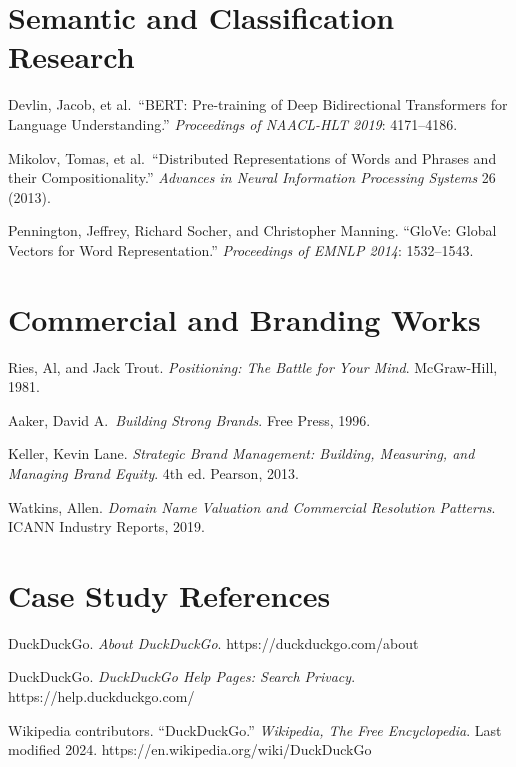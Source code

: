 \documentclass[12pt, openany]{book}
\theoremstyle{thmstyle}
\theoremstyle{defstyle}
\begin{document}
\section*{Semantic and Classification Research}

\noindent Devlin, Jacob, et al.\ ``BERT: Pre-training of Deep Bidirectional Transformers for Language Understanding.'' \textit{Proceedings of NAACL-HLT 2019}: 4171--4186.

\vspace{4pt}
\noindent Mikolov, Tomas, et al.\ ``Distributed Representations of Words and Phrases and their Compositionality.'' \textit{Advances in Neural Information Processing Systems} 26 (2013).

\vspace{4pt}
\noindent Pennington, Jeffrey, Richard Socher, and Christopher Manning. ``GloVe: Global Vectors for Word Representation.'' \textit{Proceedings of EMNLP 2014}: 1532--1543.

\section*{Commercial and Branding Works}

\noindent Ries, Al, and Jack Trout. \textit{Positioning: The Battle for Your Mind}. McGraw-Hill, 1981.

\vspace{4pt}
\noindent Aaker, David A.\ \textit{Building Strong Brands}. Free Press, 1996.

\vspace{4pt}
\noindent Keller, Kevin Lane. \textit{Strategic Brand Management: Building, Measuring, and Managing Brand Equity}. 4th ed. Pearson, 2013.

\vspace{4pt}
\noindent Watkins, Allen. \textit{Domain Name Valuation and Commercial Resolution Patterns}. ICANN Industry Reports, 2019.

\section*{Case Study References}

\noindent DuckDuckGo. \textit{About DuckDuckGo}. https://duckduckgo.com/about

\vspace{4pt}
\noindent DuckDuckGo. \textit{DuckDuckGo Help Pages: Search Privacy}. https://help.duckduckgo.com/

\vspace{4pt}
\noindent Wikipedia contributors. ``DuckDuckGo.'' \textit{Wikipedia, The Free Encyclopedia}. Last modified 2024. https://en.wikipedia.org/wiki/DuckDuckGo
\end{document}
